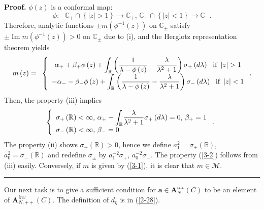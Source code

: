 \documentclass[a4paper]{article}%
\newenvironment{proof}[1][Proof]{\noindent\textbf{#1.} }{\ \rule{0.5em}{0.5em}}
\begin{document}
\begin{proof}
$\phi\left(  z\right)  $ is a conformal map:%
\[
\phi:\text{ }\mathbb{C}_{+}\cap\left\{  \left\vert z\right\vert >1\right\}
\rightarrow\mathbb{C}_{+}\text{, \ \ }\mathbb{C}_{+}\cap\left\{  \left\vert
z\right\vert <1\right\}  \rightarrow\mathbb{C}_{-}\text{.}%
\]
Therefore, analytic functions $\pm m\left(  \phi^{-1}\left(  z\right)
\right)  $ on $\mathbb{C}_{\pm}$ satisfy $\pm\operatorname{Im}m\left(
\phi^{-1}\left(  z\right)  \right)  >0$ on $\mathbb{C}_{\pm}$ due to (i), and
the Herglotz representation theorem yields%
\[
m\left(  z\right)  =\text{ }\left\{
\begin{array}
[c]{c}%
\alpha_{+}+\beta_{+}\phi\left(  z\right)  +%
{\displaystyle\int_{\mathbb{R}}}
\left(  \dfrac{1}{\lambda-\phi\left(  z\right)  }-\dfrac{\lambda}{\lambda
^{2}+1}\right)  \sigma_{+}\left(  d\lambda\right)  \text{ \ if }\left\vert
z\right\vert >1\\
-\alpha_{-}-\beta_{-}\phi\left(  z\right)  +%
{\displaystyle\int_{\mathbb{R}}}
\left(  \dfrac{1}{\lambda-\phi\left(  z\right)  }-\dfrac{\lambda}{\lambda
^{2}+1}\right)  \sigma_{-}\left(  d\lambda\right)  \text{ \ if }\left\vert
z\right\vert <1
\end{array}
\right.  \text{.}%
\]
Then, the property (iii) implies%
\[
\left\{
\begin{array}
[c]{l}%
\sigma_{+}\left(  \mathbb{R}\right)  <\infty\text{, }\alpha_{+}-%
{\displaystyle\int_{\mathbb{R}}}
\dfrac{\lambda}{\lambda^{2}+1}\sigma_{+}\left(  d\lambda\right)  =0\text{,
}\beta_{+}=1\\
\sigma_{-}\left(  \mathbb{R}\right)  <\infty\text{, }\beta_{-}=0
\end{array}
\right.  \text{. }%
\]
The property (ii) shows $\sigma_{\pm}\left(  \mathbb{R}\right)  >0$, hence we
define $a_{1}^{2}=\sigma_{+}\left(  \mathbb{R}\right)  $, $a_{0}^{2}%
=\sigma_{-}\left(  \mathbb{R}\right)  $ and redefine $\sigma_{\pm}$ by
$a_{1}^{-2}\sigma_{+}$, $a_{0}^{-2}\sigma_{-}$. The property (\ref{3-2})
follows from (iii) easily. Conversely, if $m$ is given by (\ref{3-1}), it is
clear that $m\in\mathcal{M}$. \bigskip
\end{proof}

Our next task is to give a sufficient condition for $\boldsymbol{a}%
\in\boldsymbol{A}_{N}^{inv}\left(  C\right)  $ to be an element of
$\boldsymbol{A}_{N,++}^{inv}\left(  C\right)  $. The definition of $d_{\eta}$
is in (\ref{2-28}).
\end{document}
